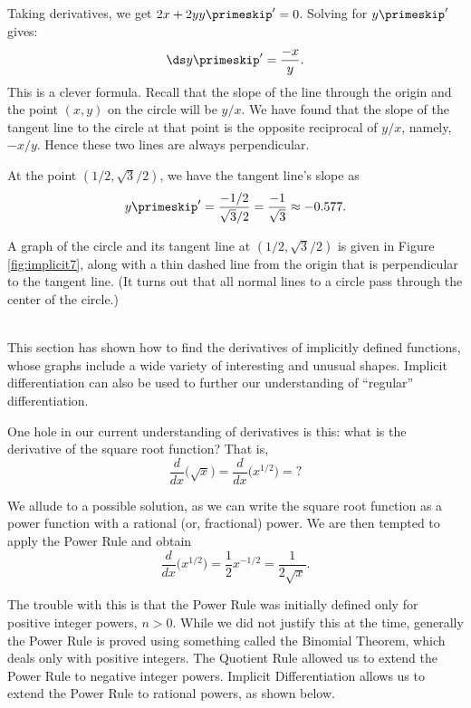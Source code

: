 {%
Taking derivatives, we get $2x+2yy\primeskip'=0$.  Solving for $y\primeskip'$  gives: $$\ds y\primeskip' = \frac{-x}{y}.$$ 
This is a clever formula. Recall that the slope of the line through the origin and the point $(x,y)$ on the circle will be $y/x$. We have found that the slope of the tangent line to the circle at that point is the opposite reciprocal of $y/x$, namely, $-x/y$. Hence these two lines are always perpendicular.

At the point $(1/2, \sqrt{3}/2)$, we have the tangent line's slope as
$$y\primeskip' = \frac{-1/2}{\sqrt{3}/2} = \frac{-1}{\sqrt{3}} \approx -0.577.$$

A graph of the circle and its tangent line at $(1/2,\sqrt{3}/2)$ is given in Figure \ref{fig:implicit7}, along with a thin dashed line from the origin that is perpendicular to the tangent line. (It turns out that all normal lines to a circle pass through the center of the circle.)
}\\

This section has shown how to find the derivatives of implicitly defined functions, whose graphs include a wide variety of interesting and unusual shapes. Implicit differentiation can also be used to further our understanding of ``regular'' differentiation. 

One hole in our current understanding of derivatives is this: what is the derivative of the square root function? That is, $$\frac{d}{dx}\big(\sqrt{x}\big) = \frac{d}{dx}\big(x^{1/2}\big) = \text{?}$$

We allude to a possible solution, as we can write the square root function as a power function with a rational (or, fractional) power. We are then tempted to apply the Power Rule and obtain $$\frac{d}{dx}\big(x^{1/2}\big) = \frac12x^{-1/2} = \frac{1}{2\sqrt{x}}.$$

The trouble with this is that the Power Rule was initially defined only for positive integer powers, $n>0$. While we did not justify this at the time, generally the Power Rule is proved using something called the Binomial Theorem, which deals only with positive integers. The Quotient Rule allowed us to extend the Power Rule to negative integer powers. Implicit Differentiation allows us to extend the Power Rule to rational powers, as shown below.

